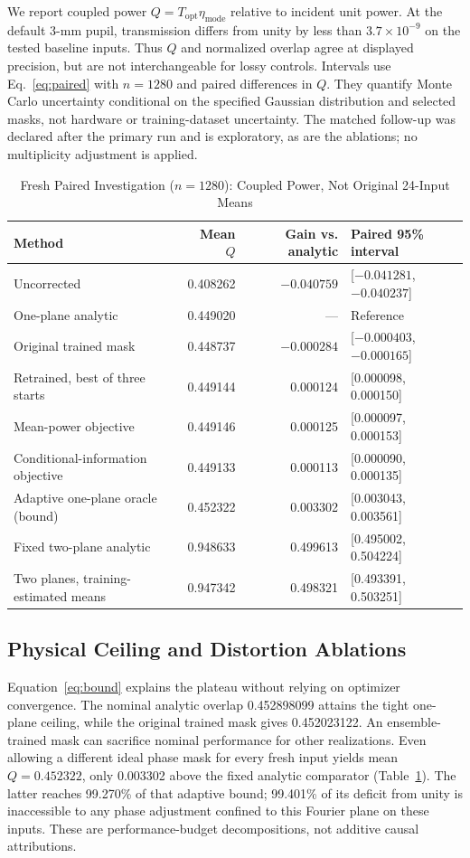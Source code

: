 \documentclass[journal]{IEEEtran}
\newcommand{\etam}{\eta_{\mathrm{mode}}}
\newcommand{\Topt}{T_{\mathrm{opt}}}
\begin{document}
We report coupled power $Q=\Topt\etam$ relative to incident unit power. At the default 3-mm pupil, transmission differs from unity by less than $3.7\times10^{-9}$ on the tested baseline inputs. Thus $Q$ and normalized overlap agree at displayed precision, but are not interchangeable for lossy controls. Intervals use Eq.~\eqref{eq:paired} with $n=1280$ and paired differences in $Q$. They quantify Monte Carlo uncertainty conditional on the specified Gaussian distribution and selected masks, not hardware or training-dataset uncertainty. The matched follow-up was declared after the primary run and is exploratory, as are the ablations; no multiplicity adjustment is applied.

\begin{table}[!t]
\caption{Fresh Paired Investigation ($n=1280$): Coupled Power, Not Original 24-Input Means}
\label{tab:fresh}
\centering\small
\begin{tabular}{lrrl}
\toprule
Method & Mean $Q$ & Gain vs. analytic & Paired 95\% interval\\
\midrule
Uncorrected & 0.408262 & $-0.040759$ & [$-0.041281$, $-0.040237$]\\
One-plane analytic & 0.449020 & --- & Reference\\
Original trained mask & 0.448737 & $-0.000284$ & [$-0.000403$, $-0.000165$]\\
Retrained, best of three starts & 0.449144 & 0.000124 & [0.000098, 0.000150]\\
Mean-power objective & 0.449146 & 0.000125 & [0.000097, 0.000153]\\
Conditional-information objective & 0.449133 & 0.000113 & [0.000090, 0.000135]\\
Adaptive one-plane oracle (bound) & 0.452322 & 0.003302 & [0.003043, 0.003561]\\
Fixed two-plane analytic & 0.948633 & 0.499613 & [0.495002, 0.504224]\\
Two planes, training-estimated means & 0.947342 & 0.498321 & [0.493391, 0.503251]\\
\bottomrule
\end{tabular}
\end{table}

\subsection{Physical Ceiling and Distortion Ablations}
Equation~\eqref{eq:bound} explains the plateau without relying on optimizer convergence. The nominal analytic overlap 0.452898099 attains the tight one-plane ceiling, while the original trained mask gives 0.452023122. An ensemble-trained mask can sacrifice nominal performance for other realizations. Even allowing a different ideal phase mask for every fresh input yields mean $Q=0.452322$, only 0.003302 above the fixed analytic comparator (Table~\ref{tab:fresh}). The latter reaches 99.270\% of that adaptive bound; 99.401\% of its deficit from unity is inaccessible to any phase adjustment confined to this Fourier plane on these inputs. These are performance-budget decompositions, not additive causal attributions.
\end{document}

